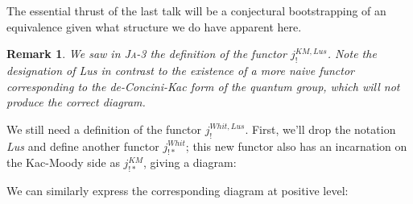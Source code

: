 \documentclass[12pt]{amsart}
\newtheorem{rmk}[thm]{Remark}
\newcommand\Ja[1]{\textsc{Ja}-#1}
\newcommand\Gr{\mathbf{Gr}}
\newcommand\KL{\mathbf{KL}}
\newcommand\Whit{\mathbf{Whit}}
\newcommand\neglv{-\kappa}
\newcommand\poslv{\kappa}
\newcommand\dneglv{-\check{\kappa}}
\newcommand\dposlv{\check{\kappa}}
\begin{document}
  The essential thrust of the last talk will be a conjectural bootstrapping of
  an equivalence given what structure we do have apparent here.

  \begin{rmk}
    We saw in \Ja{3} the definition of the functor $j_!^{KM,Lus}$. Note the
    designation of \textit{Lus} in contrast to the existence of a more naive
    functor corresponding to the de-Concini-Kac form of the quantum group, which
    will not produce the correct diagram. %
  \end{rmk}


  We still need a definition of the functor $j_!^{Whit,Lus}$. First, we'll drop
  the notation \textit{Lus}\footnotemark{} and define another functor
  $j_{!*}^{Whit}$; this new functor also
  has an incarnation on the Kac-Moody side as $j_{!*}^{KM}$, giving a diagram:


  We can similarly express the corresponding diagram at positive level:

\end{document}
